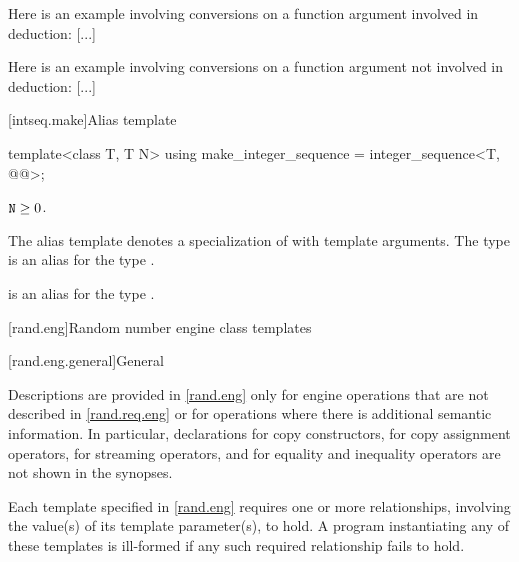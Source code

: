 \documentclass{wg21}
\begin{document}
\pnum
\begin{example}
Here is an example involving conversions on a function argument involved in
deduction:
\textcolor{noteclr}{[...]}
\end{example}

\pnum
\begin{example}
Here is an example involving conversions on a function argument not involved in
deduction:
\textcolor{noteclr}{[...]}
\end{example}



[intseq.make]{Alias template }

%
\begin{itemdecl}
    template<class T, T N>
    using make_integer_sequence = integer_sequence<T, @\seebelow{}@>;
\end{itemdecl}

\begin{itemdescr}
    \pnum
    \mandates
    $\texttt{N} \geq 0$.

    \pnum
    The alias template
     denotes a specialization of
     with   template arguments.
    The type  is an alias for the type
    .
    \begin{note}
         is an alias for the type
        .
    \end{note}
\end{itemdescr}

[rand.eng]{Random number engine class templates}%

[rand.eng.general]{General}%

\pnum
Descriptions are provided in \ref{rand.eng}
only for engine operations
that are not described in \ref{rand.req.eng}
or for operations where there is additional semantic information.
In particular,
declarations for copy constructors,
for copy assignment operators,
for streaming operators,
and for equality and inequality operators
are not shown in the synopses.

\pnum
Each template specified in \ref{rand.eng}
requires one or more relationships,
involving the value(s) of its  template parameter(s), to hold.
A program instantiating any of these templates
is ill-formed
if any such required relationship fails to hold.
\end{document}
